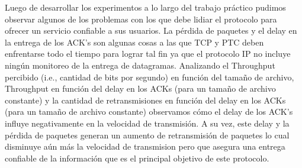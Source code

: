 Luego de desarrollar los experimentos a lo largo del trabajo práctico pudimos observar algunos de los problemas con los que debe lidiar el protocolo para ofrecer un servicio confiable a sus usuarios. La pérdida de paquetes y el delay en la entrega de los ACK's son algunas cosas a las que TCP y PTC deben enfrentarse todo el tiempo para lograr tal fin ya que el protocolo IP no incluye ningún monitoreo de la entrega de datagramas. Analizando el Throughput percibido (i.e., cantidad de bits por segundo) en función del tamaño de archivo, Throughput en función del delay en los ACKs (para un tamaño de archivo constante) y la cantidad de retransmisiones en función del delay en los ACKs (para un tamaño de archivo constante) observamos cómo el delay de los ACK's influye negativamente en la velocidad de transmisión. A su vez, este delay y la pérdida de paquetes generan un aumento de retransmisión de paquetes lo cual disminuye aún más la velocidad de transmision pero que asegura una entrega confiable de la información que es el principal objetivo de este protocolo.

